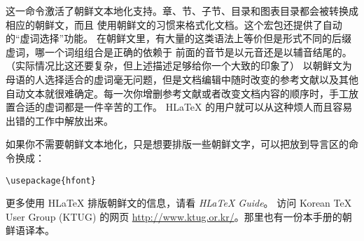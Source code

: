 这一命令激活了朝鲜文本地化支持。章、节、子节、目录和图表目录都会被转换成相应的朝鲜文，而且
使用朝鲜文的习惯来格式化文档。这个宏包还提供了自动的“虚词选择”功能。
在朝鲜文里，有大量的这类语法上等价但是形式不同的后缀虚词，哪一个词组组合是正确的依赖于
前面的音节是以元音还是以辅音结尾的。（实际情况比这还要复杂，但上述描述足够给你一个大致的印象了）
以朝鲜文为母语的人选择适合的虚词毫无问题，但是文档编辑中随时改变的参考文献以及其他
自动文本就很难确定。每一次你增删参考文献或者改变文档内容的顺序时，手工放置合适的虚词都是一件辛苦的工作。
H\LaTeX{} 的用户就可以从这种烦人而且容易出错的工作中解放出来。

如果你不需要朝鲜文本地化，只是想要排版一些朝鲜文字，可以把放到导言区的命令换成：
\begin{lscommand}
\verb+\usepackage{hfont}+
\end{lscommand}

更多使用 H\LaTeX{} 排版朝鲜文的信息，请看 \emph{H\LaTeX{} Guide}。
访问 Korean \TeX{} User Group
(KTUG) 的网页 \url{http://www.ktug.or.kr/}。那里也有一份本手册的朝鲜语译本。

